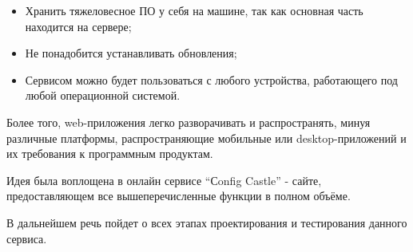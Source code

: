 \begin{itemize}
    \item Хранить тяжеловесное ПО у себя на машине, так как основная часть находится на сервере;
    \item Не понадобится устанавливать обновления;
    \item Сервисом можно будет пользоваться с любого устройства, работающего под любой операционной системой.
\end{itemize}

Более того, web-приложения легко разворачивать и распространять, минуя различные платформы,
распространяющие мобильные или desktop-приложений и их требования к программным продуктам.

Идея была воплощена в онлайн сервисе “Сonfig Castle” - сайте, предоставляющем все вышеперечисленные функции в полном объёме.

В дальнейшем речь пойдет о всех этапах проектирования и тестирования данного сервиса.

